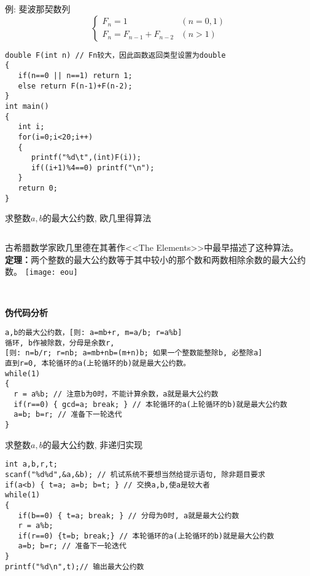 \begin{frame}{例: 斐波那契数列}
\[ \begin{cases}
F_n=1 &(n=0,1)\\
F_n=F_{n-1}+F_{n-2} &(n>1)
\end{cases} 
\]
\pause
\begin{lstlisting}
double F(int n) // Fn较大，因此函数返回类型设置为double
{
   if(n==0 || n==1) return 1;
   else return F(n-1)+F(n-2);
}
int main()                   
{  
   int i;
   for(i=0;i<20;i++)
   {
      printf("%d\t",(int)F(i));
      if((i+1)%4==0) printf("\n");
   } 
   return 0;           
}                            
\end{lstlisting}
\end{frame}

\begin{frame}{求整数$a,b$的最大公约数, 欧几里得算法}
\begin{columns}
	古希腊数学家欧几里德在其著作<<The Elements>>中最早描述了这种算法。\\
	\textbf{定理：}两个整数的最大公约数等于其中较小的那个数和两数相除余数的最大公约数。
	\texttt{[image: eou]}
\end{columns}
~\\
\textbf{伪代码分析}
\begin{lstlisting}
a,b的最大公约数，[则: a=mb+r, m=a/b; r=a%b]
循环, b作被除数，分母是余数r, 
[则: n=b/r; r=nb; a=mb+nb=(m+n)b; 如果一个整数能整除b, 必整除a]
直到r=0, 本轮循环的a(上轮循环的b)就是最大公约数。 
while(1)
{
  r = a%b; // 注意b为0时，不能计算余数，a就是最大公约数
  if(r==0) { gcd=a; break; } // 本轮循环的a(上轮循环的b)就是最大公约数
  a=b; b=r; // 准备下一轮迭代    
}
\end{lstlisting}
\end{frame}

\begin{frame}{求整数$a,b$的最大公约数, 非递归实现}
\begin{lstlisting}
int a,b,r,t;
scanf("%d%d",&a,&b); // 机试系统不要想当然给提示语句, 除非题目要求
if(a<b) { t=a; a=b; b=t; } // 交换a,b,使a是较大者
while(1)
{
   if(b==0) { t=a; break; } // 分母为0时, a就是最大公约数
   r = a%b; 
   if(r==0) {t=b; break;} // 本轮循环的a(上轮循环的b)就是最大公约数
   a=b; b=r; // 准备下一轮迭代   
}
printf("%d\n",t);// 输出最大公约数
\end{lstlisting}
\end{frame}

